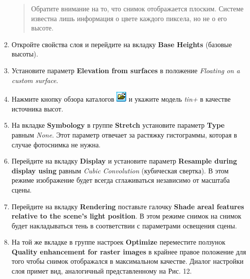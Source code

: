 \documentclass[]{book}
\theoremstyle{definition}
\theoremstyle{definition}
\theoremstyle{definition}
\theoremstyle{remark}
\begin{document}
\begin{enumerate}
  \begin{quote}
  Обратите внимание на то, что снимок отображается плоским. Системе
  известна лишь информация о цвете каждого пиксела, но не о его высоте.
  \end{quote}
\item
  Откройте свойства слоя и перейдите на вкладку \textbf{Base Heights}
  (базовые высоты).
\item
  Установите параметр \textbf{Elevation from surfaces} в положение
  \emph{Floating on a custom surface}.
\item
  Нажмите кнопку обзора каталогов
  \includegraphics{images/Ex18/image13.png} и укажите модель \emph{tin+}
  в качестве источника высот.
\item
  На вкладке \textbf{Symbology} в группе \textbf{Stretch} установите
  параметр \textbf{Type} равным \emph{None}. Этот параметр отвечает за
  растяжку гистограммы, которая в случае фотоснимка не нужна.
\item
  Перейдите на вкладку \textbf{Display} и установите параметр
  \textbf{Resample during display using} равным \emph{Cubic Convolution}
  (кубическая свертка). В этом режиме изображение будет всегда
  сглаживаться независимо от масштаба сцены.
\item
  Перейдите на вкладку \textbf{Rendering} поставьте галочку
  \textbf{Shade areal features relative to the scene's light position}.
  В этом режиме снимок на снимок будет накладываться тень в соответствии
  с параметрами освещения сцены.
\item
  На той же вкладке в группе настроек \textbf{Optimize} переместите
  ползунок \textbf{Quality enhancement for raster images} в крайнее
  правое положение для того чтобы снимок отображался в максимальном
  качестве. Диалог настройки слоя примет вид, аналогичный
  представленному на Рис. 12.


\end{enumerate}
\end{document}
